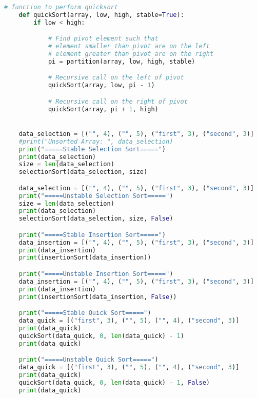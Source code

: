 \documentclass{report}
\begin{document}
\begin{lstlisting}[language=python]
	# function to perform quicksort
	def quickSort(array, low, high, stable=True):
		if low < high:

			# Find pivot element such that
			# element smaller than pivot are on the left
			# element greater than pivot are on the right
			pi = partition(array, low, high, stable)

			# Recursive call on the left of pivot
			quickSort(array, low, pi - 1)

			# Recursive call on the right of pivot
			quickSort(array, pi + 1, high)


	data_selection = [("", 4), ("", 5), ("first", 3), ("second", 3)]
	#print("Unsorted Array: ", data_selection)
	print("=====Stable Selection Sort=====")
	print(data_selection)
	size = len(data_selection)
	selectionSort(data_selection, size)

	data_selection = [("", 4), ("", 5), ("first", 3), ("second", 3)]
	print("=====Unstable Selection Sort=====")
	size = len(data_selection)
	print(data_selection)
	selectionSort(data_selection, size, False)

	print("=====Stable Insertion Sort=====")
	data_insertion = [("", 4), ("", 5), ("first", 3), ("second", 3)]
	print(data_insertion)
	print(insertionSort(data_insertion))

	print("=====Unstable Insertion Sort=====")
	data_insertion = [("", 4), ("", 5), ("first", 3), ("second", 3)]
	print(data_insertion)
	print(insertionSort(data_insertion, False))

	print("=====Stable Quick Sort=====")
	data_quick = [("first", 3), ("", 5), ("", 4), ("second", 3)]
	print(data_quick)
	quickSort(data_quick, 0, len(data_quick) - 1)
	print(data_quick)

	print("=====Unstable Quick Sort=====")
	data_quick = [("first", 3), ("", 5), ("", 4), ("second", 3)]
	print(data_quick)
	quickSort(data_quick, 0, len(data_quick) - 1, False)
	print(data_quick)
\end{lstlisting}
\end{document}
